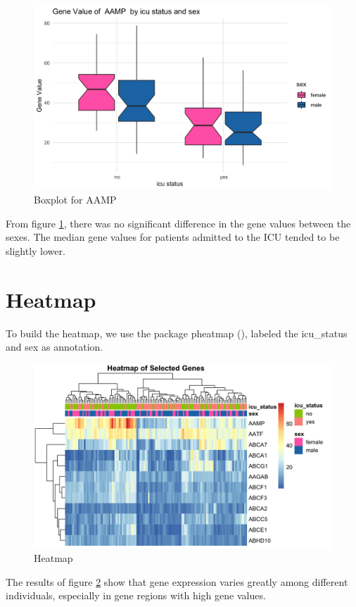 \documentclass[a4paper, 12pt, one column]{article}
\begin{document}
\begin{figure}[H]
    \centering
    \includegraphics[width=1\textwidth]{box_plot.png}     
    \caption{Boxplot for AAMP}
    \label{Box}
\end{figure}
From figure \ref{Box}, there was no significant difference in the gene values between the sexes. The median gene values for patients admitted to the ICU tended to be slightly lower.


\section{Heatmap}

To build the heatmap, we use the package pheatmap (\cite{pheatmap}), labeled the icu\_status and sex as annotation.
\begin{figure}[H]
    \centering
    \includegraphics[width=1\textwidth]{heatmap.png} 
    \caption{Heatmap}
    \label{heat}
\end{figure}
The results of figure \ref{heat} show that gene expression varies greatly among different individuals, especially in gene regions with high gene values.


\printbibliography
\end{document}
